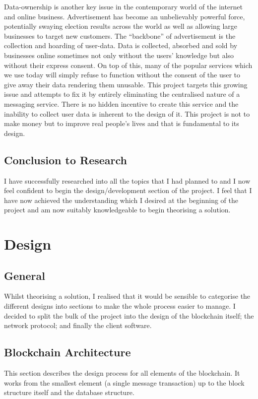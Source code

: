 \documentclass{article}
\begin{document}
Data-ownership is another key issue in the contemporary world of the internet and online business. Advertisement has become an unbelievably powerful force, potentially swaying election results across the world as well as allowing large businesses to target new customers. The ``backbone'' of advertisement is the collection and hoarding of user-data. Data is collected, absorbed and sold by businesses online sometimes not only without the users' knowledge but also without their express consent. On top of this, many of the popular services which we use today will simply refuse to function without the consent of the user to give away their data rendering them unusable. This project targets this growing issue and attempts to fix it by entirely eliminating the centralised nature of a messaging service. There is no hidden incentive to create this service and the inability to collect user data is inherent to the design of it. This project is not to make money but to improve real people's lives and that is fundamental to its design. 

\subsection{Conclusion to Research}
I have successfully researched into all the topics that I had planned to and I now feel confident to begin the design/development section of the project. I feel that I have now achieved the understanding which I desired at the beginning of the project and am now suitably knowledgeable to begin theorising a solution.

\newpage


\section{Design}

\subsection{General}
Whilst theorising a solution, I realised that it would be sensible to categorise the different designs into sections to make the whole process easier to manage. I decided to split the bulk of the project into the design of the blockchain itself; the network protocol; and finally the client software.

\subsection{Blockchain Architecture}
This section describes the design process for all elements of the blockchain. It works from the smallest element (a single message transaction) up to the block structure itself and the database structure.
\end{document}
